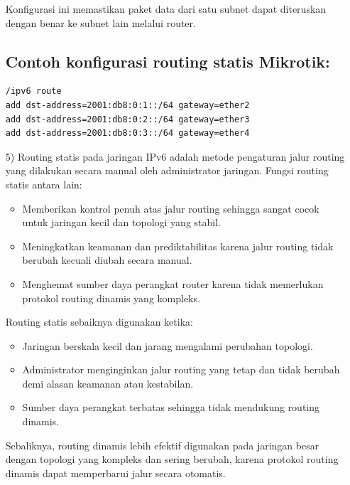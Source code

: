 \documentclass[12pt,a4paper]{article}
\begin{document}
\begin{itemize}
Konfigurasi ini memastikan paket data dari satu subnet dapat diteruskan dengan benar ke subnet lain melalui router.

\subsection*{Contoh konfigurasi routing statis Mikrotik:}
\begin{lstlisting}
/ipv6 route
add dst-address=2001:db8:0:1::/64 gateway=ether2
add dst-address=2001:db8:0:2::/64 gateway=ether3
add dst-address=2001:db8:0:3::/64 gateway=ether4
\end{lstlisting}




\item[5)] Routing statis pada jaringan IPv6 adalah metode pengaturan jalur routing yang dilakukan secara manual oleh administrator jaringan. Fungsi routing statis antara lain:

\begin{itemize}
    \item Memberikan kontrol penuh atas jalur routing sehingga sangat cocok untuk jaringan kecil dan topologi yang stabil.
    \item Meningkatkan keamanan dan prediktabilitas karena jalur routing tidak berubah kecuali diubah secara manual.
    \item Menghemat sumber daya perangkat router karena tidak memerlukan protokol routing dinamis yang kompleks.
\end{itemize}

Routing statis sebaiknya digunakan ketika:

\begin{itemize}
    \item Jaringan berskala kecil dan jarang mengalami perubahan topologi.
    \item Administrator menginginkan jalur routing yang tetap dan tidak berubah demi alasan keamanan atau kestabilan.
    \item Sumber daya perangkat terbatas sehingga tidak mendukung routing dinamis.
\end{itemize}

Sebaliknya, routing dinamis lebih efektif digunakan pada jaringan besar dengan topologi yang kompleks dan sering berubah, karena protokol routing dinamis dapat memperbarui jalur secara otomatis.










\end{itemize}
\end{document}
